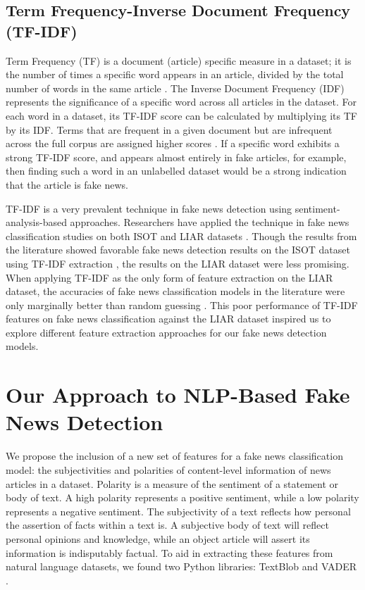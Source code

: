 \documentclass[twocolumn,10pt]{article}
\begin{document}
\subsection{Term Frequency-Inverse Document Frequency (TF-IDF)}
Term Frequency (TF) is a document (article) specific measure in a dataset; it is the number of times a specific word appears in an article, divided by the total number of words in the same article \cite{2}. The Inverse Document Frequency (IDF) represents the significance of a specific word across all articles in the dataset. For each word in a dataset, its TF-IDF score can be calculated by multiplying its TF by its IDF. Terms that are frequent in a given document but are infrequent across the full corpus are assigned higher scores \cite{2}. If a specific word exhibits a strong TF-IDF score, and appears almost entirely in fake articles, for example, then finding such a word in an unlabelled dataset would be a strong indication that the article is fake news.

TF-IDF is a very prevalent technique in fake news detection using sentiment-analysis-based approaches. Researchers have applied the technique in fake news classification studies on both ISOT and LIAR datasets \cite{3,4}. Though the results from the literature showed favorable fake news detection results on the ISOT dataset using TF-IDF extraction \cite{3}, the results on the LIAR dataset \cite{4} were less promising. When applying TF-IDF as the only form of feature extraction on the LIAR dataset, the accuracies of fake news classification models in the literature were only marginally better than random guessing \cite{4}. This poor performance of TF-IDF features on fake news classification against the LIAR dataset inspired us to explore different feature extraction approaches for our fake news detection models.

\section{Our Approach to NLP-Based Fake News Detection}
We propose the inclusion of a new set of features for a fake news classification model: the subjectivities and polarities of content-level information of news articles in a dataset. Polarity is a measure of the sentiment of a statement or body of text. A high polarity represents a positive sentiment, while a low polarity represents a negative sentiment. The subjectivity of a text reflects how personal the assertion of facts within a text is. A subjective body of text will reflect personal opinions and knowledge, while an object article will assert its information is indisputably factual. To aid in extracting these features from natural language datasets, we found two Python libraries: TextBlob \cite{5} and VADER \cite{6}.
\end{document}
